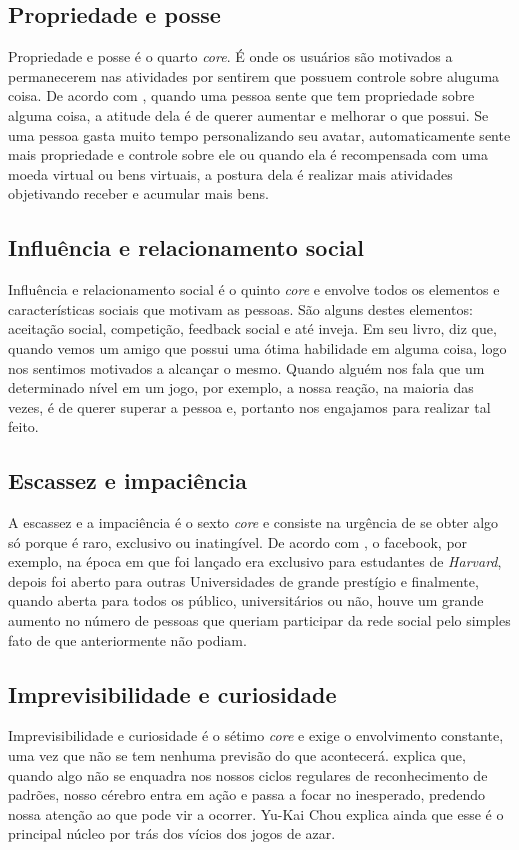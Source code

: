 \subsection{Propriedade e posse}
Propriedade e posse é o quarto \textit{core}. É onde os usuários são motivados a permanecerem nas atividades por
sentirem que possuem controle sobre aluguma coisa. De acordo com , quando uma pessoa
sente que tem propriedade sobre alguma coisa, a atitude dela é de querer aumentar e melhorar o que possui. Se uma pessoa
gasta muito tempo personalizando seu avatar, automaticamente sente mais propriedade e controle sobre ele ou quando ela é
recompensada com uma moeda virtual ou bens virtuais, a postura dela é realizar mais atividades objetivando receber
e acumular mais bens.

\subsection{Influência e relacionamento social}
Influência e relacionamento social é o quinto \textit{core} e envolve todos os elementos e características sociais que 
motivam as pessoas. São alguns destes elementos: aceitação social, competição, feedback social e até inveja. Em seu livro,
 diz que, quando vemos um amigo que possui uma ótima habilidade em alguma coisa, logo nos sentimos
motivados a alcançar o mesmo. Quando alguém nos fala que um determinado nível em um jogo, por exemplo, a nossa reação, na maioria das 
vezes, é de querer superar a pessoa e, portanto nos engajamos para realizar tal feito.

\subsection{Escassez e impaciência}
A escassez e a impaciência é o sexto \textit{core} e consiste na urgência de se obter algo só porque é raro, exclusivo ou inatingível. De 
acordo com , o facebook, por exemplo, na época em que foi lançado era exclusivo para estudantes de \textit{Harvard}, 
depois foi aberto para outras Universidades de grande prestígio e finalmente, quando aberta para todos os público, universitários ou não, 
houve um grande aumento no número de pessoas que queriam participar da rede social pelo simples fato de que anteriormente não podiam.

\subsection{Imprevisibilidade e curiosidade}
Imprevisibilidade e curiosidade é o sétimo \textit{core} e exige o envolvimento constante, uma vez que não se tem nenhuma previsão
do que acontecerá.  explica que, quando algo não se enquadra nos nossos ciclos regulares de reconhecimento
de padrões, nosso cérebro entra em ação e passa a focar no inesperado, predendo nossa atenção ao que pode vir a ocorrer. Yu-Kai Chou explica
ainda que esse é o principal núcleo por trás dos vícios dos jogos de azar.

